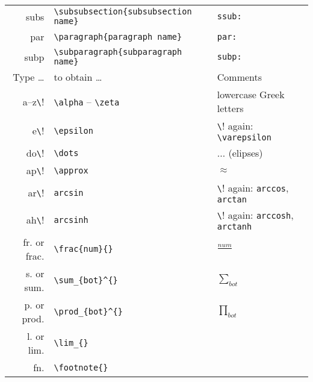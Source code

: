 \documentclass[10pt]{article}
\begin{document}
\begin{table}
\begin{tabular}{r|l|l}
	subs\tabkey       & \verb!\subsubsection{subsubsection name}!  & \texttt{ssub:}          \\
	par\tabkey        & \verb!\paragraph{paragraph name}!          & \texttt{par:}           \\
	subp\tabkey       & \verb!\subparagraph{subparagraph name}!    & \texttt{subp:}          \\
	\hline
	Type \dots                & to obtain \dots                  & Comments                                                 \\
	\hline
	a--z\cmdkey\verb!\!       & \verb!\alpha! -- \verb!\zeta!    & lowercase Greek letters                                  \\
	e\cmdkey\verb!\!          & \verb!\epsilon!                  & \cmdkey\verb!\! again: \verb!\varepsilon!                     \\
	do\cmdkey\verb!\!         & \verb!\dots!                     & $\dots$ (elipses)                                                  \\
	ap\cmdkey\verb!\!         & \verb!\approx!                   & $\approx$                                                         \\
	ar\cmdkey\verb!\!         & \texttt{arcsin}                  & \cmdkey\verb!\! again: \texttt{arccos}, \texttt{arctan}  \\
	ah\cmdkey\verb!\!         & \texttt{arcsinh}                 & \cmdkey\verb!\! again: \texttt{arccosh}, \texttt{arctanh}\\
	\hline
	fr\ctlkey\shiftkey. or frac\ctlkey\shiftkey.    & \verb!\frac{num}{}!              & $\frac{num}{}$      \\
	s\ctlkey\shiftkey. or sum\ctlkey\shiftkey.      & \verb!\sum_{bot}^{}!             & $\sum_{bot}^{}$     \\ 
	p\ctlkey\shiftkey. or prod\ctlkey\shiftkey.     & \verb!\prod_{bot}^{}!            & $\prod_{bot}^{}$    \\ 
	l\ctlkey\shiftkey. or lim\ctlkey\shiftkey.      & \verb!\lim_{}!                   &                     \\
	fn\ctlkey\shiftkey.                             & \verb!\footnote{}!               &                     \\ 

\end{tabular}
\end{table}
\end{document}
